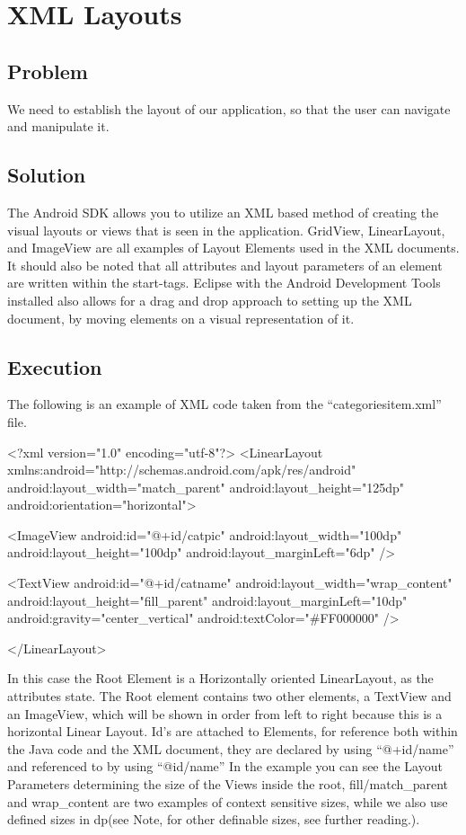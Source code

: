 \section{XML Layouts} %
\subsection*{Problem}
We need to establish the layout of our application, so that the user can navigate and manipulate it.
\subsection*{Solution}
The Android SDK allows you to utilize an XML based method of creating the visual layouts or views that is seen in the application.
GridView, LinearLayout, and ImageView are all examples of Layout Elements used in the XML documents.
It should also be noted that all attributes and layout parameters of an element are written within the start-tags.
Eclipse with the Android Development Tools installed also allows for a drag and drop approach to setting up the XML document, by moving elements on a visual representation of it.

\subsection*{Execution}
The following is an example of XML code taken from the ``categoriesitem.xml'' file.
\begin{listings}{}
<?xml version="1.0" encoding="utf-8"?>
<LinearLayout xmlns:android="http://schemas.android.com/apk/res/android"
    android:layout_width="match_parent"
    android:layout_height="125dp"
    android:orientation="horizontal">

    <ImageView
        android:id="@+id/catpic"
        android:layout_width="100dp"
        android:layout_height="100dp"
        android:layout_marginLeft="6dp" />

    <TextView
        android:id="@+id/catname"
        android:layout_width="wrap_content"
        android:layout_height="fill_parent"
        android:layout_marginLeft="10dp"
        android:gravity="center_vertical"
        android:textColor="#FF000000" />

</LinearLayout>
\end{listings}

In this case the Root Element is a Horizontally oriented LinearLayout, as the attributes state.
The Root element contains two other elements, a TextView and an ImageView, which will be shown in order from left to right because this is a horizontal Linear Layout.
Id's are attached to Elements, for reference both within the Java code and the XML document, they are declared by using ``@+id/name'' and referenced to by using ``@id/name'' 
In the example you can see the Layout Parameters determining the size of the Views inside the root, fill/match_parent and wrap_content are two examples of context sensitive sizes, while we also use defined sizes in dp(see Note, for other definable sizes, see further reading.). \\

